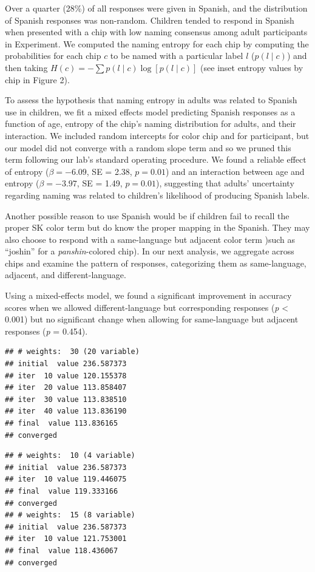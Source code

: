 \documentclass[floatsintext,man]{apa6}
\theoremstyle{definition}
\theoremstyle{definition}
\theoremstyle{definition}
\theoremstyle{remark}
\begin{document}
Over a quarter (28\%) of all responses were given in Spanish, and the
distribution of Spanish responses was non-random. Children tended to
respond in Spanish when presented with a chip with low naming consensus
among adult participants in Experiment. We computed the naming entropy
for each chip by computing the probabilities for each chip \(c\) to be
named with a particular label \(l\) (\(p(l \mid c)\)) and then taking
\(H(c) = - \sum{p(l\mid c) \log[p(l \mid c)]}\) (see inset entropy
values by chip in Figure 2).

To assess the hypothesis that naming entropy in adults was related to
Spanish use in children, we fit a mixed effects model predicting Spanish
responses as a function of age, entropy of the chip's naming
distribution for adults, and their interaction. We included random
intercepts for color chip and for participant, but our model did not
converge with a random slope term and so we pruned this term following
our lab's standard operating procedure. We found a reliable effect of
entropy (\(\beta = -6.09\), SE = 2.38, \(p = 0.01\)) and an interaction
between age and entropy (\(\beta = -3.97\), SE = 1.49, \(p = 0.01\)),
suggesting that adults' uncertainty regarding naming was related to
children's likelihood of producing Spanish labels.

Another possible reason to use Spanish would be if children fail to
recall the proper SK color term but do know the proper mapping in the
Spanish. They may also choose to respond with a same-language but
adjacent color term )such as \enquote{joshin} for a
\emph{panshin}-colored chip). In our next analysis, we aggregate across
chips and examine the pattern of responses, categorizing them as
same-language, adjacent, and different-language.

Using a mixed-effects model, we found a significant improvement in
accuracy scores when we allowed different-language but corresponding
responses (\emph{p} \textless{} 0.001) but no significant change when
allowing for same-language but adjacent responses (\emph{p} = 0.454).

\begin{verbatim}
## # weights:  30 (20 variable)
## initial  value 236.587373 
## iter  10 value 120.155378
## iter  20 value 113.858407
## iter  30 value 113.838510
## iter  40 value 113.836190
## final  value 113.836165 
## converged
\end{verbatim}

\begin{verbatim}
## # weights:  10 (4 variable)
## initial  value 236.587373 
## iter  10 value 119.446075
## final  value 119.333166 
## converged
## # weights:  15 (8 variable)
## initial  value 236.587373 
## iter  10 value 121.753001
## final  value 118.436067 
## converged
\end{verbatim}
\end{document}
